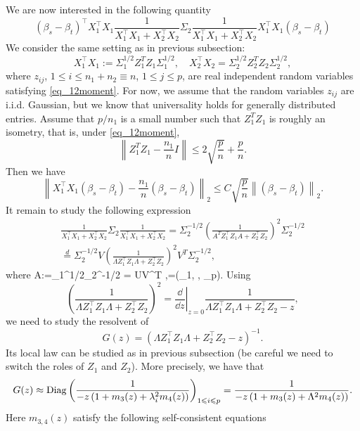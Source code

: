 We are now interested in the following quantity 
$$ (\beta_s - \beta_t)^{\top}X_1^{\top}X_1 \frac{1}{X_1^{\top}X_1 + X_2^{\top}X_2}  \Sigma_2 \frac{1}{X_1^{\top}X_1 + X_2^{\top}X_2} X_1^{\top}X_1 (\beta_s - \beta_t) $$
We consider the same setting as in previous subsection: 
$$ X_1^{\top}X_1:=\Sigma_1^{1/2}  Z_1^T Z_1 \Sigma_1^{1/2} ,\quad X_2^{\top}X_2= \Sigma_2^{1/2}  Z_2^T Z_2 \Sigma_2^{1/2},$$
where $z_{ij}$, $1 \leq i \leq n_1+n_2\equiv n$, $1 \leq j \leq p$, are real independent random variables satisfying \eqref{eq_12moment}. For now, we assume that the random variables $z_{ij}$ are i.i.d. Gaussian, but we know that universality holds for generally distributed entries. Assume that $p/n_1$ is a small number such that $Z_1^TZ_1$ is roughly an isometry, that is, under \eqref{eq_12moment}, 
$$ \left\| Z_1^T Z_1 -  \frac{n_1}{n} I \right\| \le 2\sqrt{\frac{p}{n}} + {\frac{p}{n}} .$$ 
Then we have
$$  \left\|X_1^{\top}X_1 (\beta_s - \beta_t)  - \frac{n_1}{n}(\beta_s - \beta_t)\right\|_2 \le C \sqrt{\frac{p}{n}} \left\| (\beta_s - \beta_t)\right\|_2. $$
It remain to study the following expression 
\begin{align*}
\frac{1}{X_1^{\top}X_1 + X_2^{\top}X_2}  \Sigma_2 \frac{1}{X_1^{\top}X_1 + X_2^{\top}X_2}  = \Sigma_2^{-1/2}\left(\frac{1}{A^T Z_1^{\top}Z_1 A + Z_2^{\top}Z_2} \right)^2 \Sigma_2^{-1/2} \\
\stackrel{d}{=} \Sigma_2^{-1/2}V \left(\frac{1}{\Lambda Z_1^{\top}Z_1 \Lambda + Z_2^{\top}Z_2} \right)^2 V^T \Sigma_2^{-1/2},
\end{align*}
where 
\be  \label{eigen2}
A:=\Sigma_1^{1/2}\Sigma_2^{-1/2} = U\Lambda V^T ,\quad \Lambda=(\lambda_1, \cdots, \lambda_p).
\ee
Using 
$$\left(\frac{1}{\Lambda Z_1^{\top}Z_1 \Lambda + Z_2^{\top}Z_2} \right)^2 =\left. \frac{\dd }{\dd z}\right|_{z=0}\frac{1}{\Lambda Z_1^{\top}Z_1 \Lambda + Z_2^{\top}Z_2 - z} ,$$
we  need to study the resolvent of 
$$G(z) = \left( \Lambda Z_1^{\top}Z_1 \Lambda + Z_2^{\top}Z_2 - z \right)^{-1}.$$
Its local law can be studied as in previous subsection (be careful we need to switch the roles of $Z_1$ and $Z_2$). More precisely,  we have that 
$$ G(z) \approx \operatorname{Diag}\left( \frac{1}{-z\left( 1+ m_3(z) + \lambda_i^2 m_4(z)\right)}\right)_{1\leqslant i \leqslant p}= \frac{1}{-z\left( 1+ m_3(z) + \Lambda^2 m_4(z)\right)} .$$
Here $m_{3,4}(z)$ satisfy the following self-consistent equations
